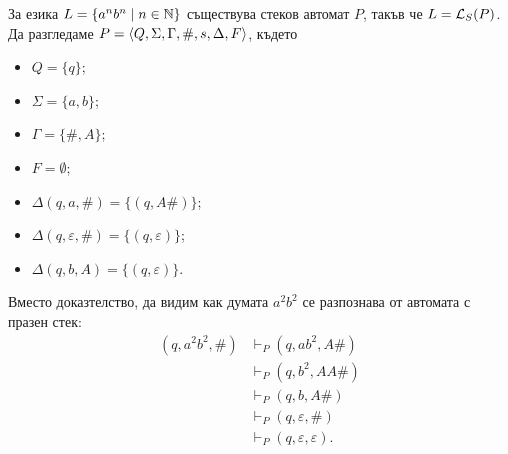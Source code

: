 \begin{example}
  \label{ex:anbn}
  За езика $L = \{a^nb^n\mid n\in\mathbb{N}\}$ съществува стеков автомат $P$, такъв че
  $L = \mathcal{L}_S(P)$.
  Да разгледаме $P = \langle{Q,\Sigma,\Gamma,\#,s,\Delta,F}\rangle$, където
  \begin{itemize}
  \item
    $Q = \{q\}$;
  \item
    $\Sigma = \{a,b\}$;
  \item
    $\Gamma = \{\#,A\}$;
  \item
    $F = \emptyset$;
  \item 
    $\Delta(q,a,\#) = \{(q, A\#)\}$;
  \item 
    $\Delta(q,\varepsilon,\#) = \{(q,\varepsilon)\}$;
  \item 
    $\Delta(q,b,A) = \{(q,\varepsilon)\}$.
  \end{itemize}
  Вместо доказтелство, да видим как думата $a^2b^2$ се разпознава от автомата с празен стек:
  \begin{align*}
    (q,a^2b^2,\#) & \vdash_P (q,ab^2,A\#) \\
    & \vdash_P (q,b^2, AA\#)\\
    & \vdash_P (q,b,A\#)\\
    & \vdash_P (q,\varepsilon,\#)\\
    & \vdash_P (q,\varepsilon,\varepsilon).
  \end{align*}
\end{example}

